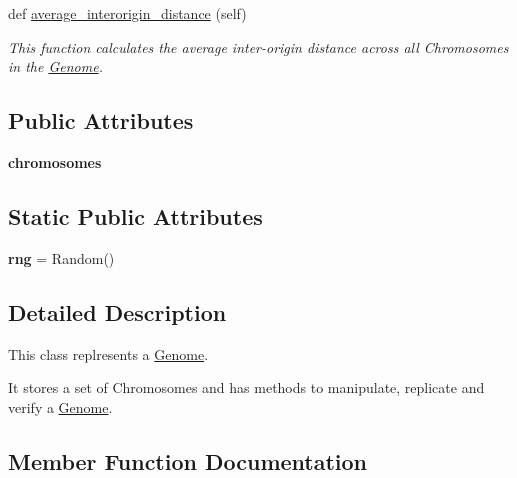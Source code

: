\begin{DoxyCompactItemize}
def \mbox{\hyperlink{classReDyMo_1_1src_1_1genome_1_1Genome_a1c933cf2a91ad7dddeed4bc940c47ad2}{average\+\_\+interorigin\+\_\+distance}} (self)
\begin{DoxyCompactList}\small\item\em This function calculates the average inter-\/origin distance across all Chromosomes in the \mbox{\hyperlink{classReDyMo_1_1src_1_1genome_1_1Genome}{Genome}}. \end{DoxyCompactList}\end{DoxyCompactItemize}
\subsection*{Public Attributes}
\begin{DoxyCompactItemize}
\item 
\mbox{\label{classReDyMo_1_1src_1_1genome_1_1Genome_a90aa6bae9a3b2eeb3c9f63dd52e17ca6}} 
{\bfseries chromosomes}
\end{DoxyCompactItemize}
\subsection*{Static Public Attributes}
\begin{DoxyCompactItemize}
\item 
\mbox{\label{classReDyMo_1_1src_1_1genome_1_1Genome_a08e3ad3e0d245d003407891178177ad5}} 
{\bfseries rng} = Random()
\end{DoxyCompactItemize}


\subsection{Detailed Description}
This class replresents a \mbox{\hyperlink{classReDyMo_1_1src_1_1genome_1_1Genome}{Genome}}. 

It stores a set of Chromosomes and has methods to manipulate, replicate and verify a \mbox{\hyperlink{classReDyMo_1_1src_1_1genome_1_1Genome}{Genome}}. 

\subsection{Member Function Documentation}
\mbox{\label{classReDyMo_1_1src_1_1genome_1_1Genome_a1c933cf2a91ad7dddeed4bc940c47ad2}} 
